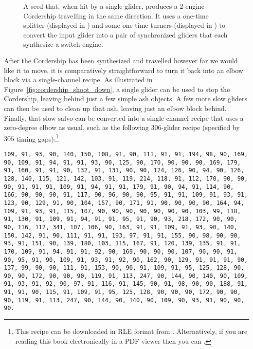 \begin{figure}[!htb]
	\centering
	
	\caption{A seed that, when hit by a single glider, produces a $2$-engine Cordership travelling in the same direction. It uses a one-time splitter (displayed in ) and some one-time turners (displayed in ) to convert the input glider into a pair of synchronized gliders that each synthesize a switch engine.}\label{fig:2_engine_cordership_seed}
\end{figure}

After the Cordership has been synthesized and travelled however far we would like it to move, it is comparatively straightforward to turn it back into an elbow block via a single-channel recipe. As illustrated in Figure~\ref{fig:cordership_shoot_down}, a single glider can be used to stop the Cordership, leaving behind just a few simple ash objects. A few more slow gliders can then be used to clean up that ash, leaving just an elbow block behind. Finally, that slow salvo can be converted into a single-channel recipe that uses a zero-degree elbow as usual, such as the following $306$-glider recipe (specified by $305$ timing gaps):\footnote{This recipe can be downloaded in RLE format from . Alternatively, if you are reading this book electronically in a PDF viewer then you can .}\\[-0.1cm]

\begin{sloppypar}
	\noindent\texttt{\footnotesize 109, 91, 93, 90, 140, 150, 108, 91, 90, 111, 91, 91, 194, 98, 90, 169, 90, 109, 91, 94, 91, 91, 93, 90, 125, 90, 170, 90, 90, 90, 169, 179, 91, 160, 91, 91, 90, 132, 91, 131, 90, 90, 124, 126, 90, 94, 90, 126, 128, 140, 115, 121, 142, 103, 91, 119, 214, 118, 91, 112, 170, 90, 90, 90, 91, 91, 91, 109, 91, 94, 91, 91, 179, 91, 90, 94, 91, 114, 90, 166, 90, 90, 90, 91, 117, 90, 96, 90, 90, 95, 91, 91, 109, 91, 93, 91, 123, 90, 129, 91, 90, 104, 157, 90, 171, 91, 90, 90, 90, 90, 164, 94, 109, 91, 93, 91, 115, 107, 90, 90, 90, 90, 90, 90, 90, 103, 99, 118, 91, 130, 91, 109, 91, 94, 91, 91, 95, 91, 90, 93, 218, 172, 90, 90, 90, 116, 112, 341, 107, 106, 90, 163, 91, 91, 109, 91, 93, 90, 140, 150, 142, 91, 90, 111, 91, 91, 193, 97, 91, 91, 155, 90, 98, 90, 90, 93, 91, 151, 90, 139, 180, 103, 115, 167, 91, 120, 139, 135, 91, 91, 170, 109, 91, 94, 91, 91, 92, 90, 169, 90, 90, 90, 107, 90, 90, 91, 90, 95, 91, 90, 109, 91, 93, 91, 92, 90, 162, 90, 129, 91, 91, 91, 90, 137, 99, 90, 90, 111, 91, 153, 90, 90, 91, 109, 91, 95, 125, 128, 90, 90, 90, 172, 90, 90, 90, 119, 91, 113, 247, 90, 144, 90, 140, 90, 109, 91, 93, 91, 92, 90, 97, 91, 116, 91, 145, 90, 91, 98, 90, 90, 188, 91, 91, 91, 90, 115, 91, 109, 91, 95, 125, 128, 90, 90, 90, 172, 90, 90, 90, 119, 91, 113, 247, 90, 144, 90, 140, 90, 109, 90, 93, 91, 90, 90, 90.}
\end{sloppypar}

